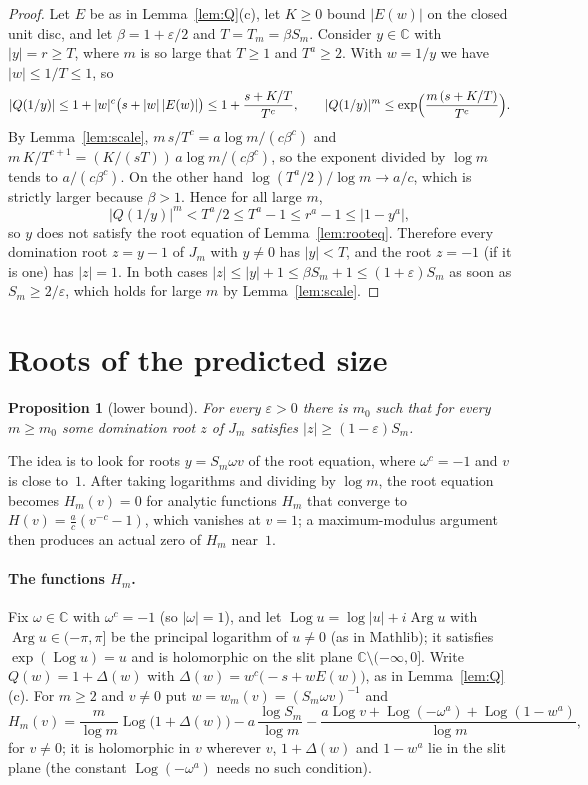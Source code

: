 \documentclass[11pt]{article}
\newtheorem{proposition}{Proposition}
\theoremstyle{definition}
\theoremstyle{remark}
\newcommand{\C}{\mathbb C}
\newcommand{\Log}{\operatorname{Log}}
\begin{document}
\begin{proof}
Let $E$ be as in Lemma~\ref{lem:Q}(c), let $K\ge0$ bound $|E(w)|$ on the
closed unit disc, and let $\beta=1+\varepsilon/2$ and $T=T_m=\beta S_m$.
Consider $y\in\C$ with $|y|=r\ge T$, where $m$ is so large that $T\ge1$ and
$T^a\ge2$. With
$w=1/y$ we have $|w|\le1/T\le1$, so
\[
|Q(1/y)|\le 1+|w|^c\bigl(s+|w|\,|E(w)|\bigr)\le 1+\frac{s+K/T}{T^c},
\qquad
|Q(1/y)|^m\le\exp\Bigl(\frac{m\,(s+K/T)}{T^c}\Bigr).
\]
By Lemma~\ref{lem:scale}, $m\,s/T^c=a\log m/(c\beta^c)$ and
$m\,K/T^{c+1}=(K/(sT))\,a\log m/(c\beta^c)$, so the exponent divided by
$\log m$ tends to $a/(c\beta^c)$. On the other hand $\log(T^a/2)/\log m\to a/c$,
which is strictly larger because $\beta>1$. Hence for all large $m$,
\[
|Q(1/y)|^m<T^a/2\le T^a-1\le r^a-1\le|1-y^a| ,
\]
so $y$ does not satisfy the root equation of Lemma~\ref{lem:rooteq}. Therefore
every domination root $z=y-1$ of $J_m$ with $y\ne0$ has $|y|<T$, and the root
$z=-1$ (if it is one) has $|z|=1$. In both cases
$|z|\le|y|+1\le\beta S_m+1\le(1+\varepsilon)S_m$ as soon as
$S_m\ge2/\varepsilon$, which holds for large $m$ by Lemma~\ref{lem:scale}.
\end{proof}

\section{Roots of the predicted size}\label{sec:lower}

\begin{proposition}[lower bound]\label{prop:lower}
For every $\varepsilon>0$ there is $m_0$ such that for every $m\ge m_0$ some
domination root $z$ of $J_m$ satisfies $|z|\ge(1-\varepsilon)S_m$.
\end{proposition}

The idea is to look for roots $y=S_m\omega v$ of the root equation, where
$\omega^c=-1$ and $v$ is close to~$1$. After taking logarithms and dividing by
$\log m$, the root equation becomes $H_m(v)=0$ for analytic functions $H_m$
that converge to $H(v)=\frac ac(v^{-c}-1)$, which vanishes at $v=1$; a
maximum-modulus argument then produces an actual zero of $H_m$ near~$1$.

\paragraph{The functions $H_m$.}
Fix $\omega\in\C$ with $\omega^c=-1$ (so $|\omega|=1$), and let $\Log u=\log|u|+i\operatorname{Arg}u$ with
$\operatorname{Arg}u\in(-\pi,\pi]$ be the principal logarithm of $u\ne0$ (as in
Mathlib); it satisfies $\exp(\Log u)=u$ and is holomorphic on the slit plane
$\C\setminus(-\infty,0]$. Write $Q(w)=1+\Delta(w)$ with
$\Delta(w)=w^c\bigl(-s+wE(w)\bigr)$, as in Lemma~\ref{lem:Q}(c). For $m\ge2$
and $v\ne0$ put $w=w_m(v)=(S_m\omega v)^{-1}$ and
\[
H_m(v)=\frac{m}{\log m}\Log\bigl(1+\Delta(w)\bigr)-a\,\frac{\log S_m}{\log m}
-\frac{a\Log v+\Log(-\omega^a)+\Log(1-w^a)}{\log m},
\]
for $v\ne0$; it is holomorphic in $v$ wherever $v$, $1+\Delta(w)$ and $1-w^a$
lie in the slit plane (the constant $\Log(-\omega^a)$ needs no such
condition).
\end{document}
